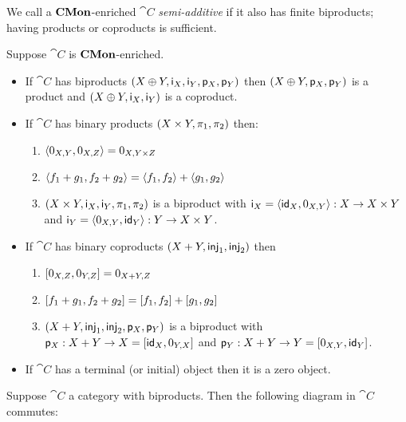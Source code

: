We call a $\mathbf{CMon}$-enriched $\cat{C}$ \emph{semi-additive} if it also has finite biproducts; having products or
coproducts is sufficient.

\begin{proposition}
\label{prop:biproduct:from-product-or-coproduct}
Suppose $\cat{C}$ is $\mathbf{CMon}$-enriched.
\begin{itemize}
\item If $\cat{C}$ has biproducts $(X \oplus Y, \mathsf{i}_X, \mathsf{i}_Y, \mathsf{p}_X, \mathsf{p}_Y)$ then $(X
\oplus Y, \mathsf{p}_X, \mathsf{p}_Y)$ is a product and $(X \oplus Y, \mathsf{i}_X, \mathsf{i}_Y)$ is a coproduct.
\item If $\cat{C}$ has binary products $(X \times Y, \pi_1, \pi_2)$ then:
\begin{enumerate}
\item $\langle 0_{X,Y}, 0_{X,Z}\rangle = 0_{X,Y \times Z}$
\item $\langle f_1 + g_1, f_2 + g_2\rangle = \langle f_1, f_2\rangle + \langle g_1, g_2\rangle$
\item $(X \times Y, \mathsf{i}_X, \mathsf{i}_Y, \pi_1, \pi_2)$ is a biproduct with $\mathsf{i}_X =
\langle \mathsf{id}_X, 0_{X,Y}\rangle: X \to X \times Y$ and $\mathsf{i}_Y = \langle 0_{X,Y}, \mathsf{id}_Y\rangle: Y \to X \times Y$.
\end{enumerate}
\item If $\cat{C}$ has binary coproducts $(X + Y, \mathsf{inj}_1, \mathsf{inj}_2)$ then
\begin{enumerate}
\item $[0_{X,Z}, 0_{Y,Z}] = 0_{X + Y,Z}$
\item $[f_1 + g_1, f_2 + g_2] = [f_1, f_2] + [g_1, g_2]$
\item $(X + Y, \mathsf{inj}_1, \mathsf{inj}_2, \mathsf{p}_X, \mathsf{p}_Y)$ is a biproduct with $\mathsf{p}_X: X + Y \to X =
[\mathsf{id}_X, 0_{Y,X}]$ and $\mathsf{p}_Y: X + Y \to Y = [0_{X,Y}, \mathsf{id}_Y]$.
\end{enumerate}
\item If $\cat{C}$ has a terminal (or initial) object then it is a zero object.
\end{itemize}
\end{proposition}

\begin{proposition}
\label{prop:biproduct:prod-coprod}
Suppose $\cat{C}$ a category with biproducts. Then the following diagram in $\cat{C}$ commutes:

\begin{center}
\end{center}
\end{proposition}
